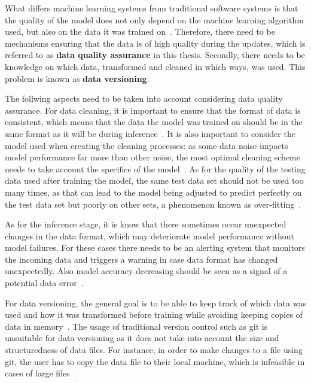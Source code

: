 What differs machine learning systems from traditional software systems is that the quality of the model does not only depend on the machine learning algorithm used, but also on the data it was trained on~\cite{polyzotisDataLifecycleChallenges2018}. Therefore, there need to be mechanisms ensuring that the data is of high quality during the updates, which is referred to as \textbf{data quality assurance} in this thesis. Secondly, there needs to be knowledge on which data, transformed and cleaned in which ways, was used. This problem is known as \textbf{data versioning}.

The follwing aspects need to be taken into account considering data quality assurance. For data cleaning, it is important to ensure that the format of data is consistent, which means that the data the model was trained on should be in the same format as it will be during inference~\cite{polyzotisDataLifecycleChallenges2018}. It is also important to consider the model used when creating the cleaning processes: as some data noise impacts model performance far more than other noise, the most optimal cleaning scheme needs to take account the specifics of the model~\cite{renggliDataQualityDrivenView2021}. As for the quality of the testing data used after training the model, the same test data set should not be used too many times, as that can lead to the model being adjusted to predict perfectly on the test data set but poorly on other sets, a phenomenon known as over-fitting~\cite{renggliDataQualityDrivenView2021}.

As for the inference stage, it is know that there sometimes occur unexpected changes in the data format, which may deteriorate model performance without model failures. For these cases there needs to be an alerting system that monitors the incoming data and triggers a warning in case data format has changed unexpectedly. Also model accuracy decreasing should be seen as a signal of a potential data error~\cite{polyzotisDataLifecycleChallenges2018}.

For data versioning, the general goal is to be able to keep track of which data was used and how it was transformed before training while avoiding keeping copies of data in memory~\cite{maddoxDecibelRelationalDataset2016}. The usage of traditional version control such as git is unsuitable for data versioning as it does not take into account the size and structuredness of data files. For instance, in order to make changes to a file using git, the user has to copy the data file to their local machine, which is infeasible in cases of large files~\cite{maddoxDecibelRelationalDataset2016}.

